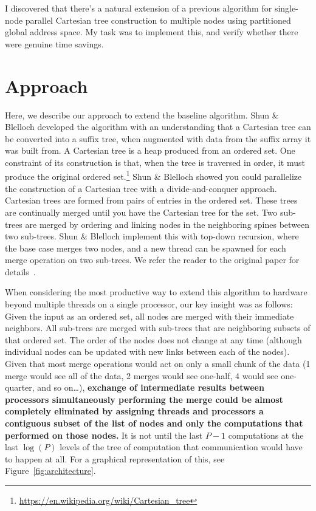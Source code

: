 \documentclass[10pt]{article}
\begin{document}
I discovered that there's a natural extension of a previous algorithm for single-node parallel Cartesian tree construction to multiple nodes using partitioned global address space.
My task was to implement this, and verify whether there were genuine time savings.
\fi

\section{Approach}

Here, we describe our approach to extend the baseline algorithm.
Shun \& Blelloch developed the algorithm with an understanding that a Cartesian tree can be
converted into a suffix tree, when augmented with data from the suffix array it was built from.
A Cartesian tree is a heap produced from an ordered set.
One constraint of its construction is that, when the tree is traversed in order,
it must produce the original ordered
set.\footnote{\url{https://en.wikipedia.org/wiki/Cartesian_tree}}
Shun \& Blelloch showed you could parallelize the construction of a Cartesian tree with a
divide-and-conquer approach.
Cartesian trees are formed from pairs of entries in the ordered set.
These trees are continually merged until you have the Cartesian tree for the set.
Two sub-trees are merged by ordering and linking nodes in the neighboring spines between
two sub-trees.
Shun \& Blelloch implement this with top-down recursion, where the base case merges two nodes, and
a new thread can be spawned for each merge operation on two sub-trees.
We refer the reader to the original paper for details~\cite{shun_simple_2014}.

When considering the most productive way to extend this algorithm to hardware beyond multiple
threads on a single processor, our key insight was as follows:
Given the input as an ordered set, all nodes are merged with their immediate neighbors.
All sub-trees are merged with sub-trees that are neighboring subsets of that ordered set.
The order of the nodes does not change at any time (although individual nodes can be updated with
new links between each of the nodes).
Given that most merge operations would act on only a small chunk of the data (1 merge would
see all of the data, 2 merges would see one-half, 4 would see one-quarter, and so on\ldots{}),
\textbf{exchange of intermediate results between processors simultaneously performing the merge
could be almost completely eliminated by assigning threads and processors a contiguous subset
of the list of nodes and only the computations that performed on those nodes.}
It is not until the last $P - 1$ computations at the last $\log (P)$ levels of the
tree of computation that communication would have to happen at all.
For a graphical representation of this, see Figure~\ref{fig:architecture}.
\end{document}
